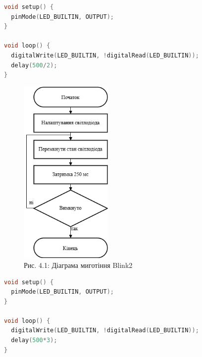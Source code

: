 \documentclass[a4paper]{article}
\begin{document}
\begin{lstlisting}[language=C++, caption=Програма Blink2 - вбудований світлодіод миготить у 2 рази швидше]
void setup() {
  pinMode(LED_BUILTIN, OUTPUT);
}

void loop() {
  digitalWrite(LED_BUILTIN, !digitalRead(LED_BUILTIN));
  delay(500/2);
}
\end{lstlisting}

\begin{figure}[h]
    \centering
    \includegraphics[width=0.4\textwidth]{imgs/LW4.0.1.png}
    \caption*{Рис. 4.1: Діаграма миготіння Blink2}
\end{figure} 

\newpage 

\begin{lstlisting}[language=C++, caption=Програма Blink3 - вбудований світлодіод миготить у 3 рази повільніше]
void setup() {
  pinMode(LED_BUILTIN, OUTPUT);
}

void loop() {
  digitalWrite(LED_BUILTIN, !digitalRead(LED_BUILTIN));
  delay(500*3);
}
\end{lstlisting}
\end{document}
